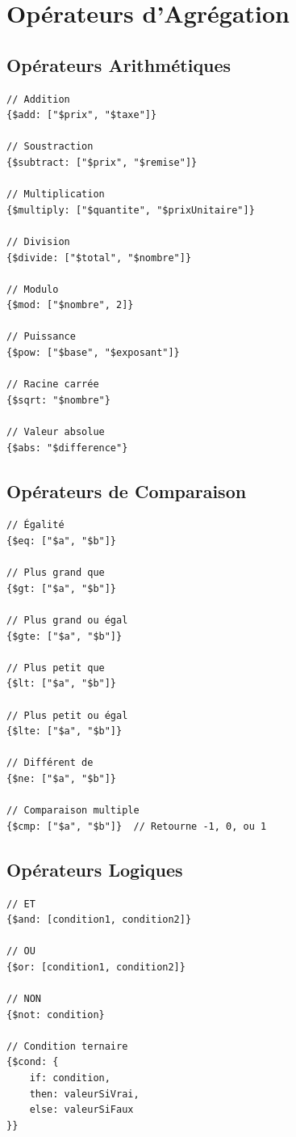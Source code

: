 \documentclass[11pt,a4paper]{article}
\begin{document}
\newpage

\section{Opérateurs d'Agrégation}

\subsection{Opérateurs Arithmétiques}

\begin{lstlisting}
// Addition
{$add: ["$prix", "$taxe"]}

// Soustraction
{$subtract: ["$prix", "$remise"]}

// Multiplication
{$multiply: ["$quantite", "$prixUnitaire"]}

// Division
{$divide: ["$total", "$nombre"]}

// Modulo
{$mod: ["$nombre", 2]}

// Puissance
{$pow: ["$base", "$exposant"]}

// Racine carrée
{$sqrt: "$nombre"}

// Valeur absolue
{$abs: "$difference"}
\end{lstlisting}

\subsection{Opérateurs de Comparaison}

\begin{lstlisting}
// Égalité
{$eq: ["$a", "$b"]}

// Plus grand que
{$gt: ["$a", "$b"]}

// Plus grand ou égal
{$gte: ["$a", "$b"]}

// Plus petit que
{$lt: ["$a", "$b"]}

// Plus petit ou égal
{$lte: ["$a", "$b"]}

// Différent de
{$ne: ["$a", "$b"]}

// Comparaison multiple
{$cmp: ["$a", "$b"]}  // Retourne -1, 0, ou 1
\end{lstlisting}

\subsection{Opérateurs Logiques}

\begin{lstlisting}
// ET
{$and: [condition1, condition2]}

// OU
{$or: [condition1, condition2]}

// NON
{$not: condition}

// Condition ternaire
{$cond: {
    if: condition,
    then: valeurSiVrai,
    else: valeurSiFaux
}}
\end{lstlisting}
\end{document}
